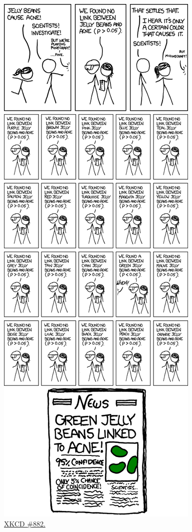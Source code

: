 \documentclass[
  12pt,
  oneside,openany]{book}
\begin{document}
\begin{figure}
\centering
\includegraphics{significant.png}
\caption{\href{https://xkcd.com/882/}{XKCD \#882.}}
\end{figure}
\end{document}
